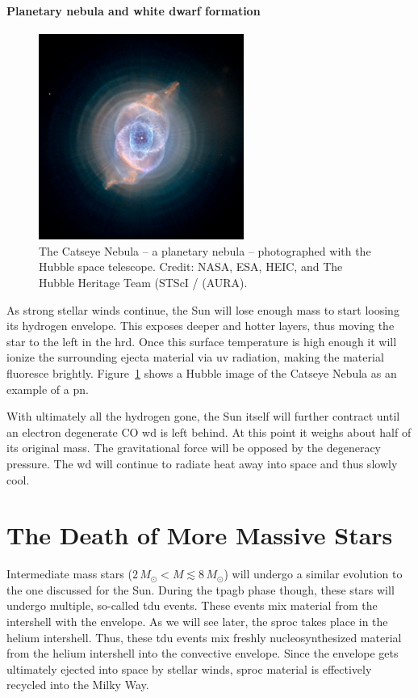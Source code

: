 \paragraph{Planetary nebula and white dwarf formation}
\begin{figure}[tb]
    \centering
    \includegraphics[width=0.6\textwidth]{graphics/sun/catseye_nebula}
    \caption{The Catseye Nebula -- a planetary nebula -- photographed with the Hubble space telescope. Credit: NASA, ESA, HEIC, and The Hubble Heritage Team (STScI / (AURA).}
    \label{fig:sun:catseye_nebula}
\end{figure}
As strong stellar winds continue, the Sun will lose enough mass to start loosing its hydrogen envelope. This exposes deeper and hotter layers, thus moving the star to the left in the \ac{hrd}. Once this surface temperature is high enough it will ionize the surrounding ejecta material via \ac{uv} radiation, making the material fluoresce brightly.
Figure~\ref{fig:sun:catseye_nebula} shows a Hubble image of the Catseye Nebula as an example of a \ac{pn}.

With ultimately all the hydrogen gone, the Sun itself will further contract until an electron degenerate CO \ac{wd} is left behind. At this point it weighs about half of its original mass. The gravitational force will be opposed by the degeneracy pressure. The \ac{wd} will continue to radiate heat away into space and thus slowly cool.


\section{The Death of More Massive Stars}

Intermediate mass stars ($2\,M_\odot < M \lesssim 8\,M_\odot$) will undergo a similar evolution to the one discussed for the Sun. During the \ac{tpagb} phase though, these stars will undergo multiple, so-called \ac{tdu} events. These events mix material from the intershell with the envelope. As we will see later, the \ac{sproc} takes place in the helium intershell. Thus, these \ac{tdu} events mix freshly nucleosynthesized material from the helium intershell into the convective envelope. Since the envelope gets ultimately ejected into space by stellar winds, \ac{sproc} material is effectively recycled into the Milky Way.

